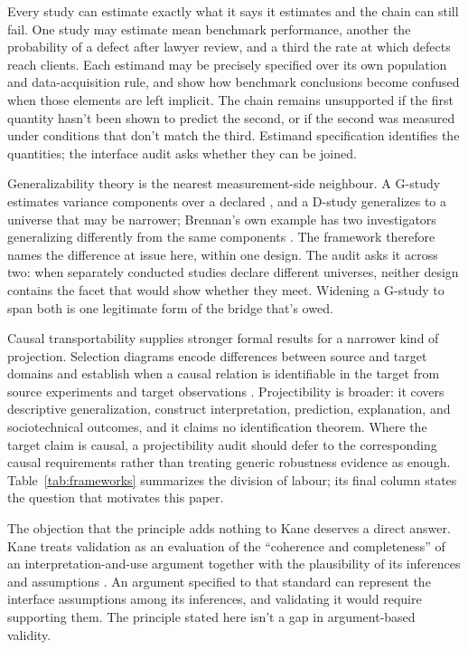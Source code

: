 \documentclass[12pt]{article}
\begin{document}
Every study can estimate exactly what it says it estimates and the chain can still fail. One study may estimate mean benchmark performance, another the probability of a defect after lawyer review, and a third the rate at which defects reach clients. Each estimand may be precisely specified over its own population and data-acquisition rule, and \textcite{binetteReiter2024estimands} show how benchmark conclusions become confused when those elements are left implicit. The chain remains unsupported if the first quantity hasn't been shown to predict the second, or if the second was measured under conditions that don't match the third. Estimand specification identifies the quantities; the interface audit asks whether they can be joined.

Generalizability theory is the nearest measurement-side neighbour. A G-study estimates variance components over a declared , and a D-study generalizes to a universe that may be narrower; Brennan's own example has two investigators generalizing differently from the same components \citep[14]{brennan2001generalizability}. The framework therefore names the difference at issue here, within one design. The audit asks it across two: when separately conducted studies declare different universes, neither design contains the facet that would show whether they meet. Widening a G-study to span both is one legitimate form of the bridge that's owed.

Causal transportability supplies stronger formal results for a narrower kind of projection. Selection diagrams encode differences between source and target domains and establish when a causal relation is identifiable in the target from source experiments and target observations \citep{pearlBareinboim2014transportability}. Projectibility is broader: it covers descriptive generalization, construct interpretation, prediction, explanation, and sociotechnical outcomes, and it claims no identification theorem. Where the target claim is causal, a projectibility audit should defer to the corresponding causal requirements rather than treating generic robustness evidence as enough. Table~\ref{tab:frameworks} summarizes the division of labour; its final column states the question that motivates this paper.

The objection that the principle adds nothing to Kane deserves a direct answer. Kane treats validation as an evaluation of the \enquote{coherence and completeness} of an interpretation-and-use argument together with the plausibility of its inferences and assumptions \citep[1]{kane2013validating}. An argument specified to that standard can represent the interface assumptions among its inferences, and validating it would require supporting them. The principle stated here isn't a gap in argument-based validity.
\end{document}
